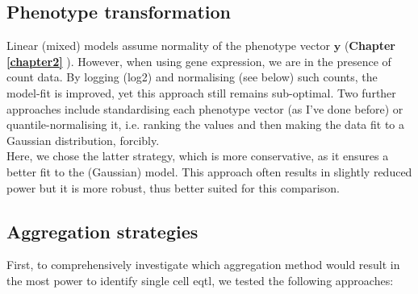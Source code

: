 


\subsection{Phenotype transformation}

Linear (mixed) models assume normality of the phenotype vector $\mathbf{y}$ (\textbf{Chapter
\ref{chapter2}
}).
However, when using gene expression, we are in the presence of count data.
By logging (log2) and normalising (see below) such counts, the model-fit is improved, yet this approach still remains sub-optimal.
Two further approaches include standardising each phenotype vector (as I've done before) or quantile-normalising it, i.e. ranking the values and then making the data fit to a Gaussian distribution, forcibly.\\

Here, we chose the latter strategy, which is more conservative, as it ensures a better fit to the (Gaussian) model.
This approach often results in slightly reduced power but it is more robust, thus better suited for this comparison.

\subsection{Aggregation strategies}


First, to comprehensively investigate which aggregation method would result in the most power to identify single cell \gls{eqtl}, we tested the following approaches:

